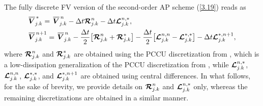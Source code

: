 \documentclass[preprint,12pt]{elsarticle}
\newcommand{\dt}{\Delta t}
\newcommand\eref[1]{(\ref{#1})}
\newcommand*\xbar[1]{%
	\hbox{%
		\vbox{%
			\hrule height 0.5pt %
			\kern0.4ex%
			\hbox{%
				\kern-0.05em%
				\ensuremath{#1}%
				\kern-0.00em%
			}%
		}%
	}%
}
\begin{document}
The fully discrete FV version of the second-order AP scheme \eref{3.19} reads as
\begin{align}
	&\xbar{\bm V}^{\,*}_{j.k}=\,\xbar{\bm V}^{\,n}_{j.k}-\dt\bm{{\cal R}}^n_{j.k}-\dt\bm{{\cal L}}^{n,*}_{j.k},\label{3.31a}\\
	&\xbar{\bm V}^{\,n+1}_{j.k}=\,\xbar{\bm V}^{\,n}_{j.k}-\frac{\dt}{2}\big[\bm{{\cal R}}^n_{j.k}+\bm{{\cal R}}^*_{j.k}\big]-
	\frac{\dt}{2}\big[\bm{{\cal L}}^{n,n}_{j.k}-\bm{{\cal L}}^{*,*}_{j.k}\big]-\dt\bm{{\cal L}}^{*,n+1}_{j.k},\label{3.31b}
\end{align}
where $\bm{{\cal R}}^n_{j.k}$ and $\bm{{\cal R}}^*_{j.k}$ are obtained using the PCCU discretization from \cite{ACKM,CKN22}, which is a
low-dissipation generalization of the PCCU discretization from \cite{diaz2019path}, while $\bm{{\cal L}}^{n,*}_{j.k}$,
$\bm{{\cal L}}^{n,n}_{j.k}$, $\bm{{\cal L}}^{*,*}_{j.k}$, and $\bm{{\cal L}}^{*,n+1}_{j.k}$ are obtained using central differences. In what
follows, for the sake of brevity, we provide details on $\bm{{\cal R}}^n_{j.k}$ and $\bm{{\cal L}}^{n,*}_{j.k}$ only, whereas the remaining
discretizations are obtained in a similar manner.
\end{document}
